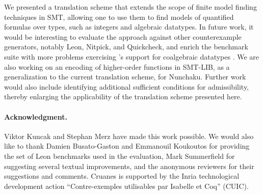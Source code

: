 We presented a translation scheme that extends the scope of finite model finding
techniques in SMT, allowing one to use them to find models of quantified formulas
over  types, such as integers and algebraic datatypes.
%
In future work, it would be interesting to evaluate the approach against other
counterexample generators, notably Leon, Nitpick, and Quickcheck,
and enrich the benchmark suite with more problems exercising \cvc's support for
coalgebraic datatypes \cite{reynolds-blanchette-2015-codata}.
We are also working on an encoding of higher-order functions in SMT-LIB, as a
generalization to the current translation scheme, for Nunchaku. Further work
would also include identifying additional sufficient conditions for
admissibility, thereby enlarging the applicability of the translation scheme
presented here.


{\footnotesize

\def\ackname{Acknowledgment}
\paragraph{%
\ackname.}
Viktor Kuncak and Stephan Merz have made this work possible. We would also like
to thank Damien Busato-Gaston and Emmanouil Koukoutos for providing the
set of Leon benchmarks used in the evaluation, Mark Summerfield for suggesting
several textual improvements, and the anonymous reviewers for their
suggestions and comments. Cruanes is supported by the Inria technological
development action ``Contre-exemples utilisables par Isabelle et Coq'' (CUIC).

}
%

{


}


